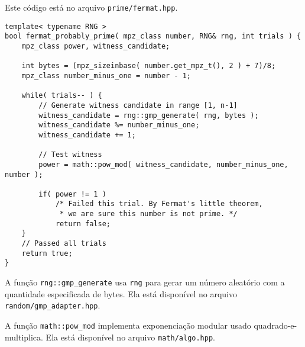 \documentclass{article}
\begin{document}
Este código está no arquivo \verb"prime/fermat.hpp".
\begin{verbatim}
template< typename RNG >
bool fermat_probably_prime( mpz_class number, RNG& rng, int trials ) {
    mpz_class power, witness_candidate;

    int bytes = (mpz_sizeinbase( number.get_mpz_t(), 2 ) + 7)/8;
    mpz_class number_minus_one = number - 1;

    while( trials-- ) {
        // Generate witness candidate in range [1, n-1]
        witness_candidate = rng::gmp_generate( rng, bytes );
        witness_candidate %= number_minus_one;
        witness_candidate += 1;

        // Test witness
        power = math::pow_mod( witness_candidate, number_minus_one, number );

        if( power != 1 )
            /* Failed this trial. By Fermat's little theorem,
             * we are sure this number is not prime. */
            return false;
    }
    // Passed all trials
    return true;
}
\end{verbatim}

A função \verb"rng::gmp_generate" usa \verb"rng" para gerar um número aleatório
com a quantidade especificada de bytes.
Ela está disponível no arquivo \verb"random/gmp_adapter.hpp".

A função \verb"math::pow_mod" implementa exponenciação modular
usado quadrado-e-multiplica.
Ela está disponível no arquivo \verb"math/algo.hpp".
\end{document}
